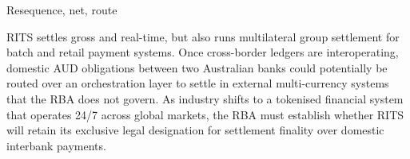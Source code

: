 \documentclass[aspectratio=169,12pt]{beamer}
\begin{document}
\begin{frame}{Resequence, net, route}
{{}}
\vspace{.10cm}
{\fontsize{7.0}{8.3}\selectfont\color{black} RITS settles gross and real-time, but also runs multilateral group settlement for batch and retail payment systems. Once cross-border ledgers are interoperating, domestic AUD obligations between two Australian banks could potentially be routed over an orchestration layer to settle in external multi-currency systems that the RBA does not govern. As industry shifts to a tokenised financial system that operates 24/7 across global markets, the RBA must establish whether RITS will retain its exclusive legal designation for settlement finality over domestic interbank payments.\par}
\end{frame}
\end{document}
